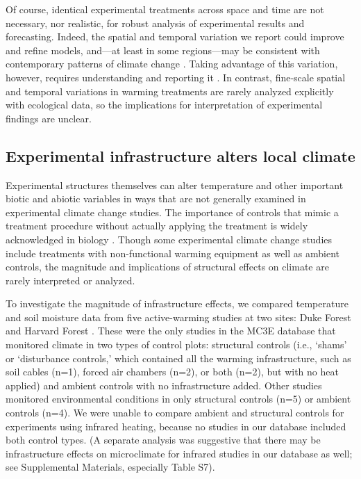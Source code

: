 \documentclass{article}
\begin{document}
\par Of course, identical experimental treatments across space and time are not necessary, nor realistic, for robust analysis of experimental results and forecasting. %
Indeed, the spatial and temporal variation we report could improve and refine models, and---at least in some regions---may be consistent with contemporary patterns of climate change \citep{ipcc2013}. Taking advantage of this variation, however, requires understanding and reporting it \citep[e.g.,][]{milcu2016}. In contrast, fine-scale spatial and temporal variations in warming treatments are rarely analyzed explicitly with ecological data, so the implications for interpretation of experimental findings are unclear.

\subsection* {Experimental infrastructure alters local climate}
Experimental structures themselves can alter temperature and other important biotic and abiotic variables in ways that are not generally examined in experimental climate change studies. The importance of controls that mimic a treatment procedure without actually applying the treatment is widely acknowledged in biology \citep[e.g.,][]{dayton1971,spector2001,johnson2002,quinn2002}. Though some experimental climate change studies include treatments with non-functional warming equipment as well as ambient controls, the magnitude and implications of structural effects on climate are rarely interpreted or analyzed.
\par To investigate the magnitude of infrastructure effects, we compared temperature and soil moisture data from five active-warming studies at two sites: Duke Forest and Harvard Forest \citep{farnsworth1995,clark2014b, marchin2015, pelini2011}. These were the only studies in the MC3E database that monitored climate in two types of control plots: structural controls (i.e., `shams' or `disturbance controls,' which contained all the warming infrastructure, such as soil cables (n=1), forced air chambers (n=2), or both (n=2), but with no heat applied) and ambient controls with no infrastructure added. Other studies monitored environmental conditions in only structural controls (n=5) or ambient controls (n=4). We were unable to compare ambient and structural controls for experiments using infrared heating, because no studies in our database included both control types. (A separate analysis was suggestive that there may be infrastructure effects on microclimate for infrared studies in our database as well; see Supplemental Materials, especially Table S7). 
\end{document}
